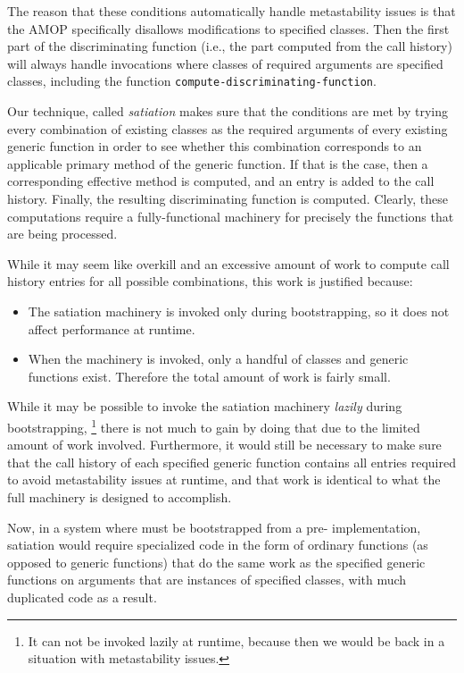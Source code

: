 The reason that these conditions automatically handle
metastability issues is that the AMOP specifically disallows
modifications to specified classes.  Then the first part of the
discriminating function (i.e., the part computed from the call
history) will always handle invocations where classes of required
arguments are specified classes, including the function
\texttt{compute-discriminating-function}. 

Our technique, called \emph{satiation} makes sure that the
conditions are met by trying every combination of existing classes as
the required arguments of every existing generic function in order to
see whether this combination corresponds to an applicable primary
method of the generic function.  If that is the case, then a
corresponding effective method is computed, and an entry is added to
the call history.  Finally, the resulting discriminating function is
computed.  Clearly, these computations require a fully-functional
machinery for precisely the functions that are being processed. 

While it may seem like overkill and an excessive amount of work to
compute call history entries for all possible combinations, this work
is justified because:

\begin{itemize}
\item The satiation machinery is invoked only during bootstrapping, so
  it does not affect performance at runtime. 
\item When the machinery is invoked, only a handful of classes and
  generic functions exist.  Therefore the total amount of work is
  fairly small.
\end{itemize}

While it may be possible to invoke the satiation machinery
\emph{lazily} during bootstrapping,%
\footnote{It can not be invoked lazily at runtime, because then we
  would be back in a situation with metastability issues.}
there is not much to gain by doing that due to the limited amount of
work involved.  Furthermore, it would still be necessary to make sure
that the call history of each specified generic function contains all
entries required to avoid metastability issues at runtime, and that
work is identical to what the full machinery is designed to
accomplish. 

Now, in a system where \clos{} must be bootstrapped from a pre-\clos{}
implementation, satiation would require specialized code in the form
of ordinary functions (as opposed to generic functions) that do the
same work as the specified generic functions on arguments that are
instances of specified classes, with much duplicated code as a result.

